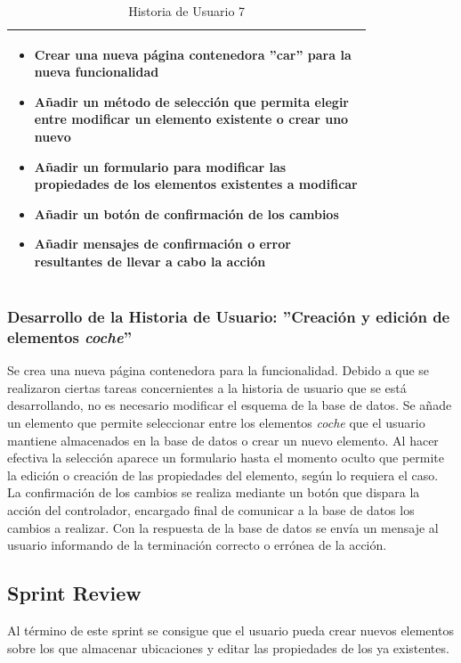 \begin{table}[H]
\begin{tabular}{p{0.4\linewidth}p{0.4\linewidth}}
		\multicolumn{2}{l}{
			\begin{minipage}{12cm}
	    		\vskip 4pt
	    		\begin{itemize}
	    			\item Crear una nueva página contenedora ''car'' para la nueva funcionalidad
	    			\item Añadir un método de selección que permita elegir entre modificar un elemento existente o crear uno nuevo
	    			\item Añadir un formulario para modificar las propiedades de los elementos existentes a modificar
	    			\item Añadir un botón de confirmación de los cambios
	    			\item Añadir mensajes de confirmación o error resultantes de llevar a cabo la acción
				\end{itemize}
			  	\vskip 4pt
		 	\end{minipage}
		} \\																				
	    \hline
	  \end{tabular}
	  \caption{Historia de Usuario 7}
	\end{table}
	
	\subsubsection{Desarrollo de la Historia de Usuario: ''Creación y edición de elementos \textit{coche}''}
	Se crea una nueva página contenedora para la funcionalidad. Debido a que se realizaron ciertas tareas concernientes a la historia de usuario que se está desarrollando, no es necesario modificar el esquema de la base de datos. Se añade un elemento que permite seleccionar entre los elementos \textit{coche} que el usuario mantiene almacenados en la base de datos o crear un nuevo elemento.
	Al hacer efectiva la selección aparece un formulario hasta el momento oculto que permite la edición o creación de las propiedades del elemento, según lo requiera el caso.
	La confirmación de los cambios se realiza mediante un botón que dispara la acción del controlador, encargado final de comunicar a la base de datos los cambios a realizar. Con la respuesta de la base de datos se envía un mensaje al usuario informando de la terminación correcto o errónea de la acción.
		
	\subsection{Sprint Review}
	Al término de este sprint se consigue que el usuario pueda crear nuevos elementos sobre los que almacenar ubicaciones y editar las propiedades de los ya existentes.

